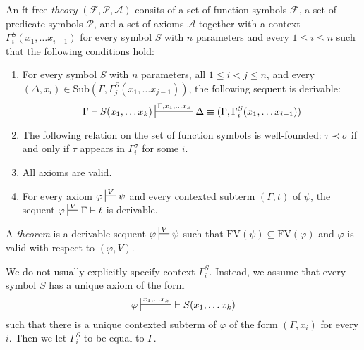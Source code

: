 \documentclass[reqno]{amsart}
\theoremstyle{definition}
\theoremstyle{remark}
\newcommand{\fs}[1]{\mathrm{#1}}
\newcommand{\FV}{\fs{FV}}
\newcommand{\ft}{\fs{ft}}
\newcommand{\sub}{\fs{Sub}}
\numberwithin{figure}{section}
\begin{document}
\begin{defn}[ft-free]
An $\ft$-free \emph{theory} $(\mathcal{F},\mathcal{P},\mathcal{A})$ consits of a set of function symbols $\mathcal{F}$, a set of predicate symbols $\mathcal{P}$, and a set of axioms $\mathcal{A}$
together with a context $\Gamma^S_i(x_1, \ldots x_{i-1})$ for every symbol $S$ with $n$ parameters and every $1 \leq i \leq n$ such that the following conditions hold:
\begin{enumerate}
\item \label{it:ax-consist} For every symbol $S$ with $n$ parameters, all $1 \leq i < j \leq n$, and every $(\Delta,x_i) \in \sub(\Gamma, \Gamma_j^S(x_1, \ldots x_{j-1}))$, the following sequent is derivable:
\[ \Gamma \vdash S(x_1, \ldots x_k) \sststile{}{\Gamma, x_1, \ldots x_k} \Delta \equiv (\Gamma, \Gamma_i^S(x_1, \ldots x_{i-1})) \]
\item \label{it:ax-wf} The following relation on the set of function symbols is well-founded: $\tau \prec \sigma$ if and only if $\tau$ appears in $\Gamma^\sigma_i$ for some $i$.
\item \label{it:ax-valid} All axioms are valid.
\item \label{it:ax-cond} For every axiom $\varphi \sststile{}{V} \psi$ and every contexted subterm $(\Gamma,t)$ of $\psi$, the sequent $\varphi \sststile{}{V} \Gamma \vdash t$ is derivable.
\end{enumerate}
A \emph{theorem} is a derivable sequent $\varphi \sststile{}{V} \psi$ such that $\FV(\psi) \subseteq \FV(\varphi)$ and $\varphi$ is valid with respect to $(\varphi,V)$.
\end{defn}

We do not usually explicitly specify context $\Gamma^S_i$.
Instead, we assume that every symbol $S$ has a unique axiom of the form
\[ \varphi \sststile{}{x_1, \ldots x_k}\ \vdash S(x_1, \ldots x_k) \]
such that there is a unique contexted subterm of $\varphi$ of the form $(\Gamma,x_i)$ for every $i$.
Then we let $\Gamma^S_i$ to be equal to $\Gamma$.
\end{document}
